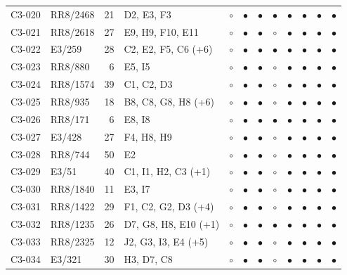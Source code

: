 {\begin{longtable}{llrp{3.9cm}cccccccc}
    C3-020 & RR8/2468 & 21 & D2, E3, F3 & $\circ$ & $\bullet$ & $\bullet$ & $\bullet$ & $\bullet$ & $\bullet$ & $\bullet$ & $\bullet$ \\
    C3-021 & RR8/2618 & 27 & E9, H9, F10, E11 & $\circ$ & $\bullet$ & $\bullet$ & $\circ$ & $\bullet$ & $\bullet$ & $\bullet$ & $\bullet$ \\
    C3-022 & E3/259 & 28 & C2, E2, F5, C6 (+6) & $\circ$ & $\bullet$ & $\bullet$ & $\bullet$ & $\bullet$ & $\bullet$ & $\bullet$ & $\bullet$ \\
    C3-023 & RR8/880 & 6 & E5, I5 & $\circ$ & $\bullet$ & $\bullet$ & $\circ$ & $\bullet$ & $\bullet$ & $\bullet$ & $\bullet$ \\
    C3-024 & RR8/1574 & 39 & C1, C2, D3 & $\circ$ & $\bullet$ & $\bullet$ & $\circ$ & $\bullet$ & $\bullet$ & $\bullet$ & $\bullet$ \\
    C3-025 & RR8/935 & 18 & B8, C8, G8, H8 (+6) & $\circ$ & $\bullet$ & $\bullet$ & $\circ$ & $\bullet$ & $\bullet$ & $\bullet$ & $\bullet$ \\
    C3-026 & RR8/171 & 6 & E8, I8 & $\circ$ & $\bullet$ & $\bullet$ & $\bullet$ & $\bullet$ & $\bullet$ & $\bullet$ & $\bullet$ \\
    C3-027 & E3/428 & 27 & F4, H8, H9 & $\circ$ & $\bullet$ & $\bullet$ & $\circ$ & $\bullet$ & $\bullet$ & $\bullet$ & $\bullet$ \\
    C3-028 & RR8/744 & 50 & E2 & $\circ$ & $\bullet$ & $\bullet$ & $\circ$ & $\bullet$ & $\bullet$ & $\bullet$ & $\bullet$ \\
    C3-029 & E3/51 & 40 & C1, I1, H2, C3 (+1) & $\circ$ & $\bullet$ & $\bullet$ & $\circ$ & $\bullet$ & $\bullet$ & $\bullet$ & $\bullet$ \\
    C3-030 & RR8/1840 & 11 & E3, I7 & $\circ$ & $\bullet$ & $\bullet$ & $\circ$ & $\bullet$ & $\bullet$ & $\bullet$ & $\bullet$ \\
    C3-031 & RR8/1422 & 29 & F1, C2, G2, D3 (+4) & $\circ$ & $\bullet$ & $\bullet$ & $\circ$ & $\bullet$ & $\bullet$ & $\bullet$ & $\bullet$ \\
    C3-032 & RR8/1235 & 26 & D7, G8, H8, E10 (+1) & $\circ$ & $\bullet$ & $\bullet$ & $\bullet$ & $\bullet$ & $\bullet$ & $\bullet$ & $\bullet$ \\
    C3-033 & RR8/2325 & 12 & J2, G3, I3, E4 (+5) & $\circ$ & $\bullet$ & $\bullet$ & $\circ$ & $\bullet$ & $\bullet$ & $\bullet$ & $\bullet$ \\
    C3-034 & E3/321 & 30 & H3, D7, C8 & $\circ$ & $\bullet$ & $\bullet$ & $\circ$ & $\bullet$ & $\bullet$ & $\bullet$ & $\bullet$ \\

\end{longtable}}
